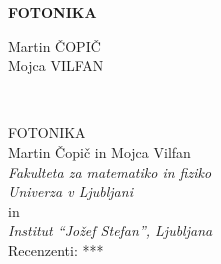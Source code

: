 \documentclass[11pt,fleqn]{book} %
\begin{document}
\let\cleardoublepage\clearpage
\makeatletter
\setlength{\@fptop}{0pt}
\makeatother




\begingroup
\thispagestyle{empty}
\centering
\vspace*{5cm}
\par\normalfont\fontsize{35}{35}\sffamily\selectfont
\textbf{FOTONIKA}\\
{\LARGE }\par %
\vspace*{1cm}
\vspace*{1cm}
\vspace*{8cm}
{\Large Martin ČOPIČ \\Mojca VILFAN \\}\par %
\endgroup


\newpage
~\vfill
\thispagestyle{empty}

FOTONIKA \\

Martin Čopič in Mojca Vilfan\\
{\it Fakulteta za matematiko in fiziko\\
Univerza v Ljubljani}\\
in\\
{\it Institut ``Jožef Stefan'', Ljubljana}\\
 
 Recenzenti: {***}\\ %

\end{document}
